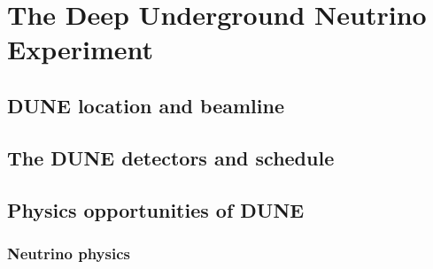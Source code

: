 
\chapter{The Deep Underground Neutrino Experiment}  %

\graphicspath{{DUNE/Figs/PDF/}{DUNE/Figs/Raster/}{DUNE/Figs/Vector}}





\section{DUNE location and beamline} %

\section{The DUNE detectors and schedule} \label{sec:DUNEDetector} %

\section{Physics opportunities of DUNE} %

\subsection{Neutrino physics}  %


